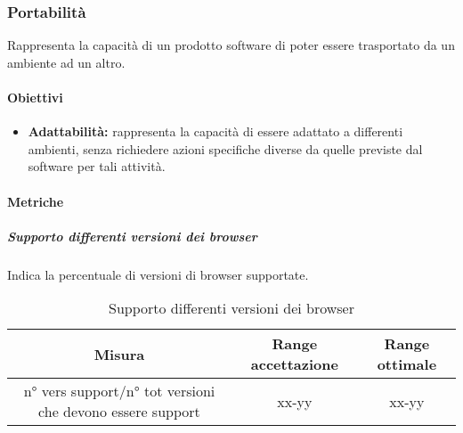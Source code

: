	\subsubsection{Portabilità}
	Rappresenta la capacità di un prodotto software di poter essere trasportato da un ambiente ad un altro.
		
		\paragraph{Obiettivi}
			\begin{itemize}
				\item \textbf{Adattabilità:} rappresenta la capacità di essere adattato a differenti ambienti, senza richiedere azioni specifiche diverse da quelle previste dal software per tali attività.
			\end{itemize}
		
		\paragraph{Metriche}
			\subparagraph{Supporto differenti versioni dei browser}
			Indica la percentuale di versioni di browser supportate.
			\begin{table}[H]
				\begin{center}
					\begin{tabular}{|c|c|c|}
						\hline
						\textbf{Misura} & \textbf{Range accettazione} & \textbf{Range ottimale} \\
						\hline
						n° vers support/n° tot versioni che devono essere support & xx-yy  & xx-yy \\
						\hline
					\end{tabular}
				\end{center}
				\caption{Supporto differenti versioni dei browser}
			\end{table}
		
